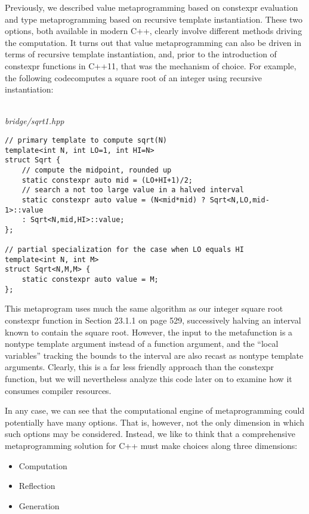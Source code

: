 Previously, we described value metaprogramming based on constexpr evaluation and type metaprogramming based on recursive template instantiation. These two options, both available in modern C++, clearly involve different methods driving the computation. It turns out that value metaprogramming can also be driven in terms of recursive template instantiation, and, prior to the introduction of constexpr functions in C++11, that was the mechanism of choice. For example, the following codecomputes a square root of an integer using recursive instantiation:

\hspace*{\fill} \\ %
\noindent
\textit{bridge/sqrt1.hpp}
\begin{lstlisting}[style=styleCXX]
// primary template to compute sqrt(N)
template<int N, int LO=1, int HI=N>
struct Sqrt {
	// compute the midpoint, rounded up
	static constexpr auto mid = (LO+HI+1)/2;
	// search a not too large value in a halved interval
	static constexpr auto value = (N<mid*mid) ? Sqrt<N,LO,mid-1>::value
	: Sqrt<N,mid,HI>::value;
};

// partial specialization for the case when LO equals HI
template<int N, int M>
struct Sqrt<N,M,M> {
	static constexpr auto value = M;
};
\end{lstlisting}

This metaprogram uses much the same algorithm as our integer square root constexpr function in Section 23.1.1 on page 529, successively halving an interval known to contain the square root. However, the input to the metafunction is a nontype template argument instead of a function argument, and the “local variables” tracking the bounds to the interval are also recast as nontype template arguments. Clearly, this is a far less friendly approach than the constexpr function, but we will nevertheless analyze this code later on to examine how it consumes compiler resources.

In any case, we can see that the computational engine of metaprogramming could potentially have many options. That is, however, not the only dimension in which such options may be considered. Instead, we like to think that a comprehensive metaprogramming solution for C++ must make choices along three dimensions:

\begin{itemize}
\item 
Computation

\item 
Reflection

\item 
Generation
\end{itemize}

